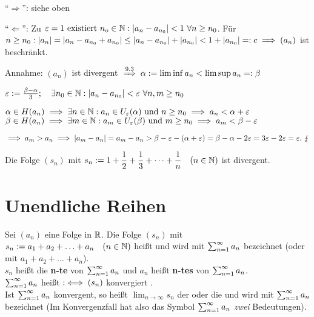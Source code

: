 \documentclass[a4paper,twoside,DIV15,BCOR12mm]{scrbook}
\begin{document}
\begin{beweis}
"`$\Rightarrow$"': siehe oben

"`$\Leftarrow$"': Zu $\varepsilon=1 \text{ existiert } n_o\in\mathbb{N}: |a_n-a_{n_0}| < 1\ \forall n \ge n_0$. Für $n \ge n_0: |a_n| = |a_n-a_{n_0}+a_{n_0}| \le |a_n-a_{n_0}| + |a_{n_0}| < 1+|a_{n_0}| =: c \implies (a_n)$ ist beschränkt.

Annahme: $(a_n)$ ist divergent $\folgtnach{9.3} \alpha := \lim\inf a_n < \lim\sup a_n =: \beta$

$\varepsilon:=\frac{\beta-\alpha}{3};\quad\exists n_0\in\mathbb{N}: |a_n-a_{n_0}| < \varepsilon\ \forall n,m \ge n_0$

$\alpha \in H(a_n) \implies \exists n\in\mathbb{N}: a_n \in U_{\varepsilon}(\alpha)\text{ und } n \ge n_0 \implies a_n<\alpha+\varepsilon$\\
$\beta \in H(a_n) \implies \exists m\in\mathbb{N}: a_m \in U_{\varepsilon}(\beta)\text{ und } m \ge n_0 \implies a_m<\beta-\varepsilon$

$\implies a_m > a_n \implies |a_m-a_n| = a_m-a_n > \beta-\varepsilon-(\alpha+\varepsilon) = \beta-\alpha-2\varepsilon = 3\varepsilon-2\varepsilon = \varepsilon.\ \lightning$
\end{beweis}

\begin{folgerung}
Die Folge $(s_n)$ mit $\displaystyle{s_n := 1+\frac{1}{2}+\frac{1}{3}+\cdots+\frac{1}{n}\quad(n\in\ensuremath{\mathbb{N}})}$ ist divergent.
\end{folgerung}

\chapter{Unendliche Reihen}

\begin{definition}
Sei $(a_n)$ eine Folge in $\mathbb{R}$. Die Folge $(s_n)$ mit $s_n := a_1+a_2+\ldots+a_n\quad(n\in\mathbb{N})$ heißt  und wird mit $\sum_{n=1}^{\infty}{a_n}$ bezeichnet (oder mit $a_1+a_2+\ldots+a_n$).\\
$s_n$ heißt die \textbf{n-te } von $\sum_{n=1}^{\infty}{a_n}$ und $a_n$ heißt \textbf{n-tes } von $\sum_{n=1}^{\infty}{a_n}$.\\
$\sum_{n=1}^{\infty}{a_n}$ heißt   $:\iff (s_n)$ konvergiert .\\
Ist $\sum_{n=1}^{\infty}{a_n}$ konvergent, so heißt $\lim_{n\to\infty}{s_n}$ der  oder die  und wird mit $\sum_{n=1}^{\infty}{a_n}$ bezeichnet (Im Konvergenzfall hat also das Symbol $\sum_{n=1}^{\infty}{a_n}$ \emph{zwei} Bedeutungen).
\end{definition}
\end{document}
